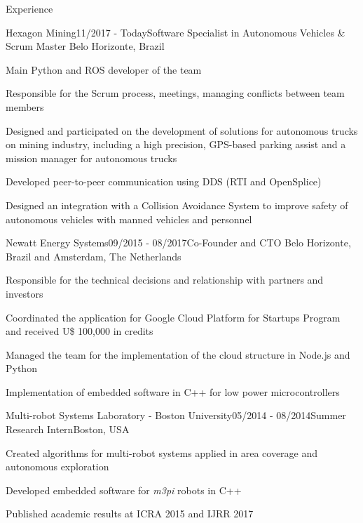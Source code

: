 \documentclass[14pt, a4paper]{resume} %
\begin{document}
\begin{rSection}{Experience}


\begin{rSubsection}{Hexagon Mining}{11/2017 - Today}{\normalfont Software Specialist in Autonomous Vehicles \& Scrum Master}{ \normalfont Belo Horizonte, Brazil}
 	\item Main Python and ROS developer of the team
 	\item Responsible for the Scrum process, meetings, managing conflicts between team members
 	\item Designed and participated on the development of solutions for autonomous trucks on mining industry, including a high precision, GPS-based parking assist and a mission manager for autonomous trucks
 	\item Developed peer-to-peer communication using DDS (RTI and OpenSplice)
 	\item Designed an integration with a Collision Avoidance System to improve safety of autonomous vehicles with manned vehicles and personnel
\end{rSubsection}

\begin{rSubsection}{Newatt Energy Systems}{09/2015 - 08/2017}{\normalfont Co-Founder and CTO}{ \normalfont Belo Horizonte, Brazil and Amsterdam, The Netherlands}
 	\item Responsible for the technical decisions and relationship with partners and investors
 	\item Coordinated the application for Google Cloud Platform for Startups Program and received U\$ 100,000 in credits
 	\item Managed the team for the implementation of the cloud structure in Node.js and Python
 	\item Implementation of embedded software in C++ for low power microcontrollers
\end{rSubsection}

\begin{rSubsection}{Multi-robot Systems Laboratory - Boston University}{05/2014 - 08/2014}{\normalfont Summer Research Intern}{\normalfont Boston,  USA}
	\item Created algorithms for multi-robot systems applied in area coverage and autonomous exploration 
	\item Developed embedded software for \textit{m3pi} robots in C++
	\item Published academic results at ICRA 2015 and IJRR 2017
\end{rSubsection}



\end{rSection}
\end{document}
